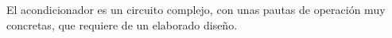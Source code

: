 El acondicionador es un circuito complejo, con unas pautas de operación muy
concretas, que requiere de un elaborado diseño.





